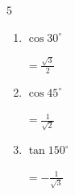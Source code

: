 \begin{multicols}{5}
\begin{enumerate}
        $\displaystyle =\frac{1}{\sqrt{2}}$

  \item $\displaystyle \cos{30^\circ}$

        $\displaystyle =\frac{\sqrt{3}}{2}$

  \item $\displaystyle \cos{45^\circ}$

        $\displaystyle =\frac{1}{\sqrt{2}}$

  \item $\displaystyle \tan{150^\circ}$

        $\displaystyle =-\frac{1}{\sqrt{3}}$

\end{enumerate}
\end{multicols}
